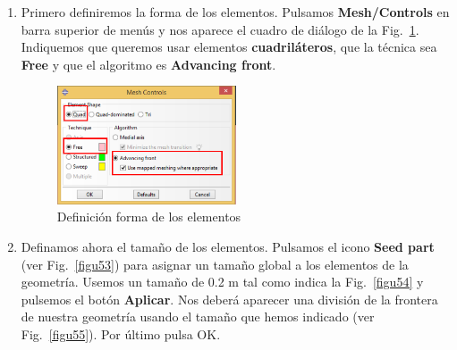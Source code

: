 \begin{enumerate}
\item Primero definiremos la forma de los elementos. Pulsamos
  \textbf{Mesh/Controls} en barra superior de menús y nos aparece el
  cuadro de diálogo de la Fig.~\ref{figu52}. Indiquemos que queremos
  usar elementos \textbf{cuadriláteros}, que la técnica sea
  \textbf{Free} y que el algoritmo es \textbf{Advancing front}.
  \begin{figure}[H]
    \centering
    \includegraphics[width=0.50\textwidth]{./body/images/imagen52.pdf}
    \caption{Definición forma de los elementos}
    \label{figu52}
  \end{figure}
\item Definamos ahora el tamaño de los elementos. Pulsamos el icono
  \textbf{Seed part} (ver Fig.~\ref{figu53}) para asignar un tamaño
  global a los elementos de la geometría. Usemos un tamaño de 0.2 m
  tal como indica la Fig.~\ref{figu54} y pulsemos el botón
  \textbf{Aplicar}. Nos deberá aparecer una división de la frontera de
  nuestra geometría usando el tamaño que hemos indicado (ver
  Fig.~\ref{figu55}). Por último pulsa OK.


\end{enumerate}
